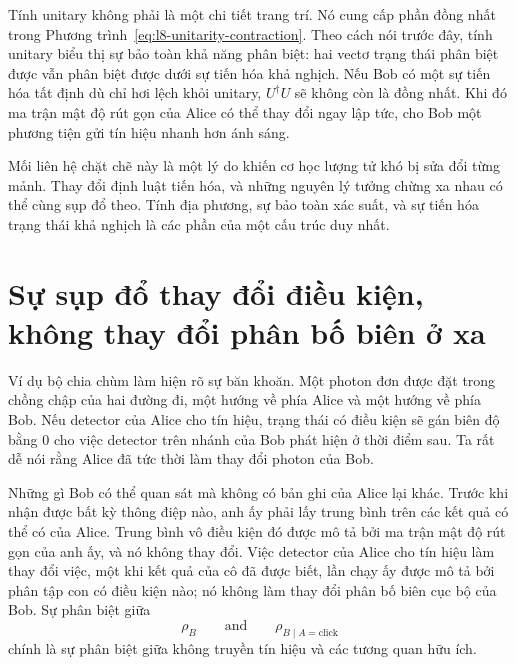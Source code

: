 Tính unitary không phải là một chi tiết trang trí. Nó cung cấp phần đồng nhất trong Phương trình~\eqref{eq:l8-unitarity-contraction}. Theo cách nói trước đây, tính unitary biểu thị sự bảo toàn khả năng phân biệt: hai vectơ trạng thái phân biệt được vẫn phân biệt được dưới sự tiến hóa khả nghịch. Nếu Bob có một sự tiến hóa tất định dù chỉ hơi lệch khỏi unitary, \(U^\dagger U\) sẽ không còn là đồng nhất. Khi đó ma trận mật độ rút gọn của Alice có thể thay đổi ngay lập tức, cho Bob một phương tiện gửi tín hiệu nhanh hơn ánh sáng.

Mối liên hệ chặt chẽ này là một lý do khiến cơ học lượng tử khó bị sửa đổi từng mảnh. Thay đổi định luật tiến hóa, và những nguyên lý tưởng chừng xa nhau có thể cùng sụp đổ theo. Tính địa phương, sự bảo toàn xác suất, và sự tiến hóa trạng thái khả nghịch là các phần của một cấu trúc duy nhất.

\begin{classroomqa}
\end{classroomqa}

\section{Sự sụp đổ thay đổi điều kiện, không thay đổi phân bố biên ở xa}

Ví dụ bộ chia chùm làm hiện rõ sự băn khoăn. Một photon đơn được đặt trong chồng chập của hai đường đi, một hướng về phía Alice và một hướng về phía Bob. Nếu detector của Alice cho tín hiệu, trạng thái có điều kiện sẽ gán biên độ bằng 0 cho việc detector trên nhánh của Bob phát hiện ở thời điểm sau. Ta rất dễ nói rằng Alice đã tức thời làm thay đổi photon của Bob.

Những gì Bob có thể quan sát mà không có bản ghi của Alice lại khác. Trước khi nhận được bất kỳ thông điệp nào, anh ấy phải lấy trung bình trên các kết quả có thể có của Alice. Trung bình vô điều kiện đó được mô tả bởi ma trận mật độ rút gọn của anh ấy, và nó không thay đổi. Việc detector của Alice cho tín hiệu làm thay đổi việc, một khi kết quả của cô đã được biết, lần chạy ấy được mô tả bởi phân tập con có điều kiện nào; nó không làm thay đổi phân bố biên cục bộ của Bob. Sự phân biệt giữa
\begin{equation}
\rho_B
\qquad\text{and}\qquad
\rho_{B\mid A=\text{click}}
\end{equation}
chính là sự phân biệt giữa không truyền tín hiệu và các tương quan hữu ích.

